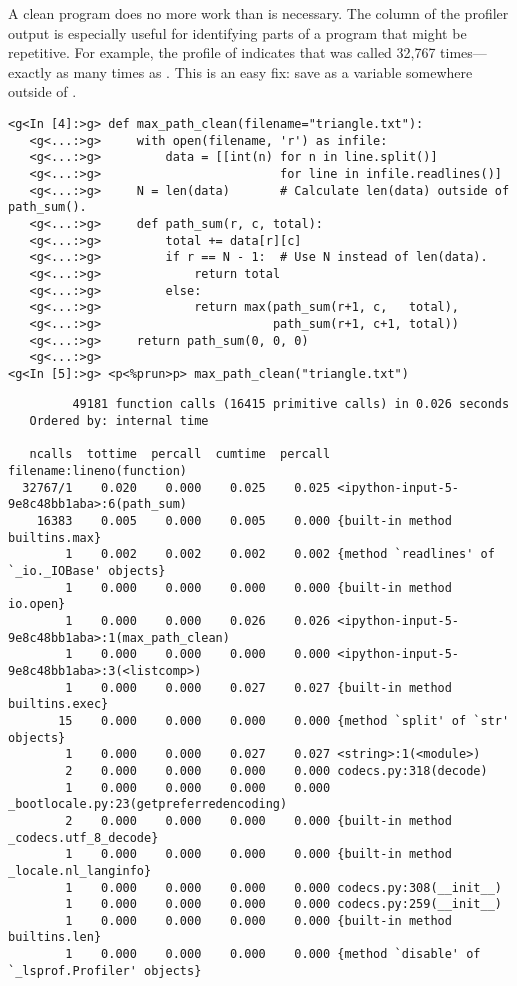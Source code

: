 A clean program does no more work than is necessary.
The  column of the profiler output is especially useful for identifying parts of a program that might be repetitive.
For example, the profile of  indicates that  was called 32,767 times---exactly as many times as .
This is an easy fix: save  as a variable somewhere outside of .
\begin{lstlisting}
<g<In [4]:>g> def max_path_clean(filename="triangle.txt"):
   <g<...:>g>     with open(filename, 'r') as infile:
   <g<...:>g>         data = [[int(n) for n in line.split()]
   <g<...:>g>                         for line in infile.readlines()]
   <g<...:>g>     N = len(data)       # Calculate len(data) outside of path_sum().
   <g<...:>g>     def path_sum(r, c, total):
   <g<...:>g>         total += data[r][c]
   <g<...:>g>         if r == N - 1:  # Use N instead of len(data).
   <g<...:>g>             return total
   <g<...:>g>         else:
   <g<...:>g>             return max(path_sum(r+1, c,   total),
   <g<...:>g>                        path_sum(r+1, c+1, total))
   <g<...:>g>     return path_sum(0, 0, 0)
   <g<...:>g>
<g<In [5]:>g> <p<%prun>p> max_path_clean("triangle.txt")
\end{lstlisting}
{\small
\begin{verbatim}
         49181 function calls (16415 primitive calls) in 0.026 seconds
   Ordered by: internal time

   ncalls  tottime  percall  cumtime  percall filename:lineno(function)
  32767/1    0.020    0.000    0.025    0.025 <ipython-input-5-9e8c48bb1aba>:6(path_sum)
    16383    0.005    0.000    0.005    0.000 {built-in method builtins.max}
        1    0.002    0.002    0.002    0.002 {method `readlines' of `_io._IOBase' objects}
        1    0.000    0.000    0.000    0.000 {built-in method io.open}
        1    0.000    0.000    0.026    0.026 <ipython-input-5-9e8c48bb1aba>:1(max_path_clean)
        1    0.000    0.000    0.000    0.000 <ipython-input-5-9e8c48bb1aba>:3(<listcomp>)
        1    0.000    0.000    0.027    0.027 {built-in method builtins.exec}
       15    0.000    0.000    0.000    0.000 {method `split' of `str' objects}
        1    0.000    0.000    0.027    0.027 <string>:1(<module>)
        2    0.000    0.000    0.000    0.000 codecs.py:318(decode)
        1    0.000    0.000    0.000    0.000 _bootlocale.py:23(getpreferredencoding)
        2    0.000    0.000    0.000    0.000 {built-in method _codecs.utf_8_decode}
        1    0.000    0.000    0.000    0.000 {built-in method _locale.nl_langinfo}
        1    0.000    0.000    0.000    0.000 codecs.py:308(__init__)
        1    0.000    0.000    0.000    0.000 codecs.py:259(__init__)
        1    0.000    0.000    0.000    0.000 {built-in method builtins.len}
        1    0.000    0.000    0.000    0.000 {method `disable' of `_lsprof.Profiler' objects}
\end{verbatim}
}

